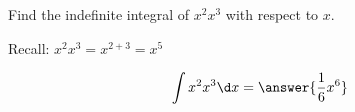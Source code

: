 \documentclass{ximera}
\author{Gregory Hartman \and Matthew Carr\and Nela Lakos}
\begin{document}
\begin{exercise}


Find the indefinite integral of $x^{2}x^{3}$ with respect to $x$.
\begin{hint}
Recall: $x^{2}x^{3}=x^{2+3}=x^5$
\end{hint}
\[
\int x^{2}x^{3} \d x=\answer{\frac{1}{6}x^{6}}
\]


\end{exercise}
\end{document}
